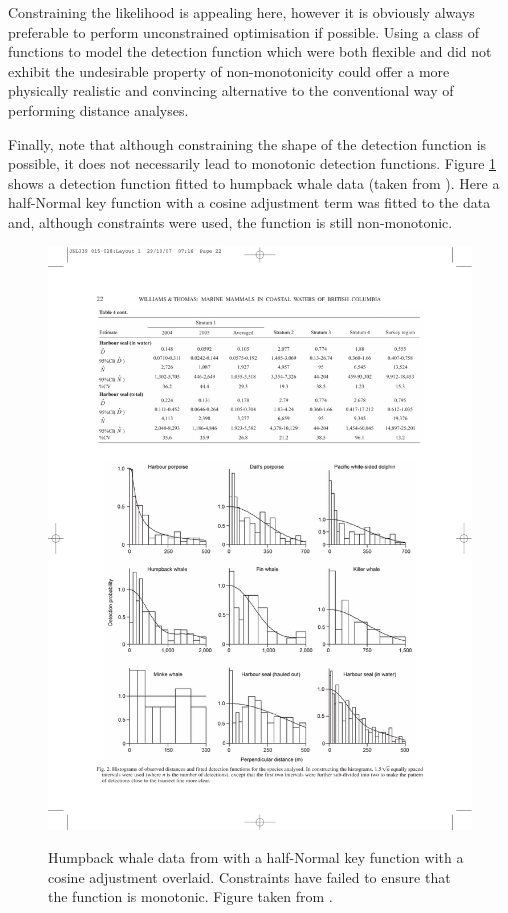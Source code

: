 Constraining the likelihood is appealing here, however it is obviously always preferable to perform unconstrained optimisation if possible. Using a class of functions to model the detection function which were both flexible and did not exhibit the undesirable property of non-monotonicity could offer a more physically realistic and convincing alternative to the conventional way of performing distance analyses.

Finally, note that although constraining the shape of the detection function is possible, it does not necessarily lead to monotonic detection functions. Figure \ref{humpback-nonmono} shows a detection function fitted to humpback whale data (taken from \cite{williams}). Here a half-Normal key function with a cosine adjustment term was fitted to the data and, although constraints were used, the function is still non-monotonic.

\begin{figure}
\centering
\includegraphics{intro/figs/humpback-nonmono.pdf}\\
\caption{Humpback whale data from \cite{williams} with a half-Normal key function with a cosine adjustment overlaid. Constraints have failed to ensure that the function is monotonic. Figure taken from \cite{williams}.}
\label{humpback-nonmono}
\end{figure}




